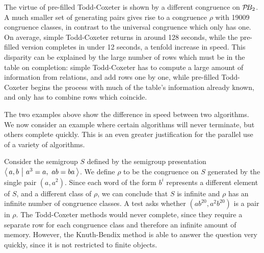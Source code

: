 \begin{example}
  \label{ex:good-tc-prefill}
  The virtue of pre-filled Todd-Coxeter is shown by a different congruence on
  $\mathcal{P}\!B_2$.  A much smaller set of generating pairs gives rise to a congruence
  $\rho$ with 19009 congruence classes, in contrast to the universal congruence
  which only has one.  On average, simple Todd-Coxeter returns in around 128
  seconds, while the pre-filled version completes in under 12 seconds, a tenfold
  increase in speed.  This disparity can be explained by the large number of
  rows which must be in the table on completion: simple Todd-Coxeter has to
  compute a large amount of information from relations, and add rows one by one,
  while pre-filled Todd-Coxeter begins the process with much of the table's
  information already known, and only has to combine rows which coincide.
\end{example}

The two examples above show the difference in speed between two algorithms.  We
now consider an example where certain algorithms will never terminate, but
others complete quickly.  This is an even greater justification for the parallel
use of a variety of algorithms.

\begin{example}
  \label{ex:good-kbfp}
  Consider the semigroup $S$ defined by the semigroup presentation
  $\left\langle\,a,b ~\middle|~ a^3=a,\ ab=ba\,\right\rangle$.  We define $\rho$ to be the congruence on $S$
  generated by the single pair $(a, a^2)$.  Since each word of the form $b^i$
  represents a different element of $S$, and a different class of $\rho$, we can
  conclude that $S$ is infinite and $\rho$ has an infinite number of congruence
  classes.  A test asks whether $(ab^{20}, a^2b^{20})$ is a pair in $\rho$.  The
  Todd-Coxeter methods would never complete, since they require a separate row
  for each congruence class and therefore an infinite amount of memory.
  However, the Knuth-Bendix method is able to answer the question very quickly,
  since it is not restricted to finite objects.
\end{example}



